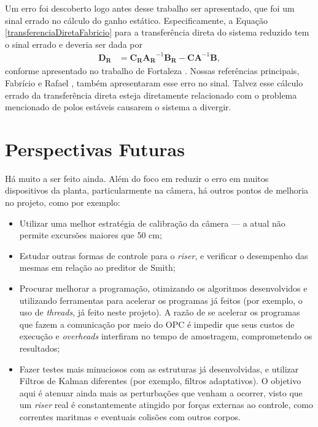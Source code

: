 Um erro foi descoberto logo antes desse trabalho ser apresentado, que foi um sinal errado no cálculo do ganho estático. Especificamente, a Equação \ref{transferenciaDiretaFabricio} para a transferência direta do sistema reduzido tem o sinal errado e deveria ser dada por \begin{align}
	\mathbf{D_R} &= \mathbf{C_R}\mathbf{A_R}^{-1}\mathbf{B_R} - \mathbf{C}\mathbf{A}^{-1}\mathbf{B},
\end{align} conforme apresentado no trabalho de Fortaleza \cite{teseEugenio}. Nossas referências principais, Fabrício \cite{fabricioIFAC} e Rafael \cite{rafaelMestrado}, também apresentaram esse erro no sinal. Talvez esse cálculo errado da transferência direta esteja diretamente relacionado com o problema mencionado de polos estáveis causarem o sistema a divergir.

\section{Perspectivas Futuras}
Há muito a ser feito ainda. Além do foco em reduzir o erro em muitos dispositivos da planta, particularmente na câmera, há outros pontos de melhoria no projeto, como por exemplo:
\begin{itemize}
\item Utilizar uma melhor estratégia de calibração da câmera --- a atual não permite excursões maiores que 50 cm;
\item Estudar outras formas de controle para o \textit{riser}, e verificar o desempenho das mesmas em relação ao preditor de Smith;
\item Procurar melhorar a programação, otimizando os algoritmos desenvolvidos e utilizando ferramentas para acelerar os programas já feitos (por exemplo, o uso de \textit{threads}, já feito neste projeto). A razão de se acelerar os programas que fazem a comunicação por meio do OPC é impedir que seus custos de execução e \textit{overheads} interfiram no tempo de amostragem, comprometendo os resultados;
\item Fazer testes mais minuciosos com as estruturas já desenvolvidas, e utilizar Filtros de Kalman diferentes (por exemplo, filtros adaptativos). O objetivo aqui é atenuar ainda mais as perturbações que venham a ocorrer, visto que um \textit{riser} real é constantemente atingido por forças externas ao controle, como correntes maritmas e eventuais colisões com outros corpos.
\end{itemize}